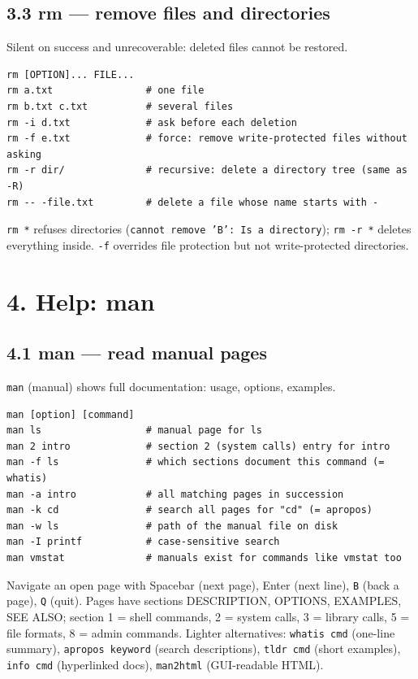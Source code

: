 \documentclass[11pt,a4paper]{article}
\newcommand{\cmd}[1]{\texttt{#1}}
\begin{document}
\subsection{3.3 rm --- remove files and directories}
Silent on success and unrecoverable: deleted files cannot be restored.
\begin{lstlisting}
rm [OPTION]... FILE...
rm a.txt                # one file
rm b.txt c.txt          # several files
rm -i d.txt             # ask before each deletion
rm -f e.txt             # force: remove write-protected files without asking
rm -r dir/              # recursive: delete a directory tree (same as -R)
rm -- -file.txt         # delete a file whose name starts with -
\end{lstlisting}
\cmd{rm *} refuses directories (\cmd{cannot remove 'B': Is a directory}); \cmd{rm -r *} deletes everything inside. \cmd{-f} overrides file protection but not write-protected directories.

\section{4. Help: man}

\subsection{4.1 man --- read manual pages}
\cmd{man} (manual) shows full documentation: usage, options, examples.
\begin{lstlisting}
man [option] [command]
man ls                  # manual page for ls
man 2 intro             # section 2 (system calls) entry for intro
man -f ls               # which sections document this command (= whatis)
man -a intro            # all matching pages in succession
man -k cd               # search all pages for "cd" (= apropos)
man -w ls               # path of the manual file on disk
man -I printf           # case-sensitive search
man vmstat              # manuals exist for commands like vmstat too
\end{lstlisting}
Navigate an open page with Spacebar (next page), Enter (next line), \cmd{B} (back a page), \cmd{Q} (quit). Pages have sections DESCRIPTION, OPTIONS, EXAMPLES, SEE ALSO; section 1 = shell commands, 2 = system calls, 3 = library calls, 5 = file formats, 8 = admin commands. Lighter alternatives: \cmd{whatis cmd} (one-line summary), \cmd{apropos keyword} (search descriptions), \cmd{tldr cmd} (short examples), \cmd{info cmd} (hyperlinked docs), \cmd{man2html} (GUI-readable HTML).
\end{document}
